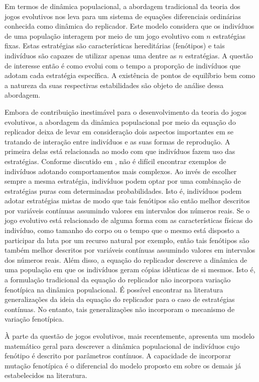 \documentclass[
	12pt,				%
	openany,			%
	oneoside,			%
	a4paper,			%
	english,			%
	spanish,			%
	brazil,				%
	]{abntex2}
\begin{document}
Em termos de dinâmica populacional, a abordagem tradicional da teoria dos jogos evolutivos nos leva para um sistema de equações diferenciais ordinárias conhecida como dinâmica do replicador.  Este modelo considera que os indivíduos de uma população interagem por meio de um jogo evolutivo com $n$  estratégias fixas. Estas estratégias são características hereditárias (fenótipos)  e tais indivíduos são capazes de utilizar apenas uma dentre as $n$ estratégias. A questão de interesse então é como evolui com o tempo a proporção de indivíduos que adotam cada estratégia específica. A existência de pontos de equilíbrio bem como a natureza da suas  respectivas estabilidades são objeto de análise dessa abordagem. 

Embora de contribuição inestimável para o desenvolvimento da teoria do jogos evolutivos, a abordagem da dinâmica populacional por meio da equação do replicador deixa de levar em consideração dois aspectos importantes em se tratando de interação entre indivíduos e as suas formas de reprodução. A primeira delas está relacionada ao modo com que indivíduos fazem uso das estratégias. Conforme discutido em \cite{MAYBOOK}, não é difícil encontrar exemplos de indivíduos adotando comportamentos mais complexos. Ao invés de escolher sempre a mesma estratégia, indivíduos podem optar por uma combinação de estratégias puras com determinadas probabilidades. Isto é, indivíduos podem adotar estratégias mistas de modo que tais fenótipos são então melhor descritos por variáveis contínuas assumindo valores em intervalos dos números reais. Se o jogo evolutivo está relacionado de alguma forma com as características físicas do indivíduo, como tamanho do corpo ou o tempo que o mesmo está disposto a participar da luta por um recurso natural por exemplo, então tais fenótipos são também melhor descritos por variáveis contínuas assumindo valores em intervalos dos números reais. Além disso, a equação do replicador descreve a dinâmica de uma população em que os indivíduos geram cópias idênticas de si mesmos. Isto é, a formulação tradicional da equação do replicador não incorpora variação fenotípica na dinâmica populacional. É possível encontrar na literatura generalizações da ideia da equação do replicador para o caso de estratégias contínuas. No entanto, tais generalizações não incorporam o mecanismo de variação fenotípica.  

À parte da questão de jogos evolutivos, mais recentemente, \cite{RAAT} apresenta um modelo matemático geral para descrever a dinâmica populacional de indivíduos cujo fenótipo é descrito por parâmetros contínuos. A capacidade de incorporar mutação fenotípica é o diferencial do modelo proposto em \cite{RAAT} sobre os demais já estabelecidos na literatura.   
\end{document}

